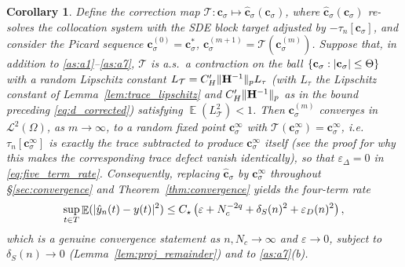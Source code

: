 \documentclass[11pt, a4paper]{article}
\theoremstyle{theoremstyle}
\newtheorem{corollary}[theorem]{Corollary}
\theoremstyle{definitionstyle}
\DeclareMathOperator{\EE}{\mathbb E}
\DeclarePairedDelimiter{\norm}{\lVert}{\rVert}
\DeclarePairedDelimiter{\abs}{\lvert}{\rvert}
\begin{document}
\begin{corollary}\label{cor:fixed_point_correction}
    Define the correction map $\mathcal T : \mathbf c_\sigma \mapsto \hat{\mathbf c}_\sigma(\mathbf c_\sigma)$, where $\hat{\mathbf c}_\sigma(\mathbf c_\sigma)$ re-solves the collocation system with the SDE block target adjusted by $-\tau_n[\mathbf c_\sigma]$, and consider the Picard sequence $\mathbf c_\sigma^{(0)} = \mathbf c^*_\sigma$, $\mathbf c_\sigma^{(m+1)} = \mathcal T(\mathbf c_\sigma^{(m)})$. Suppose that, in addition to \ref{as:a1}--\ref{as:a7}, $\mathcal T$ is a.s.\ a contraction on the ball $\{\mathbf c_\sigma : \abs{\mathbf c_\sigma}\le\Theta\}$ with a random Lipschitz constant $L_\mathcal T = C_H' \norm{\mathbf H^{-1}}_p L_\tau$ (with $L_\tau$ the Lipschitz constant of Lemma~\ref{lem:trace_lipschitz} and $C_H'\norm{\mathbf H^{-1}}_p$ as in the bound preceding \eqref{eq:d_corrected}) satisfying $\EE(L_\mathcal T^2) < 1$. Then $\mathbf c_\sigma^{(m)}$ converges in $\mathcal L^2(\Omega)$, as $m\to\infty$, to a random fixed point $\mathbf c_\sigma^\infty$ with $\mathcal T(\mathbf c_\sigma^\infty) = \mathbf c_\sigma^\infty$, i.e.\ $\tau_n[\mathbf c_\sigma^\infty]$ is exactly the trace subtracted to produce $\mathbf c_\sigma^\infty$ itself (see the proof for why this makes the corresponding trace defect vanish identically), so that $\varepsilon_\Delta = 0$ in \eqref{eq:five_term_rate}. Consequently, replacing $\hat{\mathbf c}_\sigma$ by $\mathbf c_\sigma^\infty$ throughout \S\ref{sec:convergence} and Theorem~\ref{thm:convergence} yields the four-term rate
    \begin{equation}\label{eq:four_term_rate}
        \sup_{t \in T} \EE (\abs{\hat y_n(t) - y(t)}^2) \leq C_\star \left ( \varepsilon + N_c^{-2q} + \delta_S(n)^2 + \varepsilon_D(n)^2 \right ),
    \end{equation}
    which is a genuine convergence statement as $n, N_c \to \infty$ and $\varepsilon \to 0$, subject to $\delta_S(n)\to 0$ (Lemma~\ref{lem:proj_remainder}) and to \ref{as:a7}(b).
\end{corollary}
\end{document}
